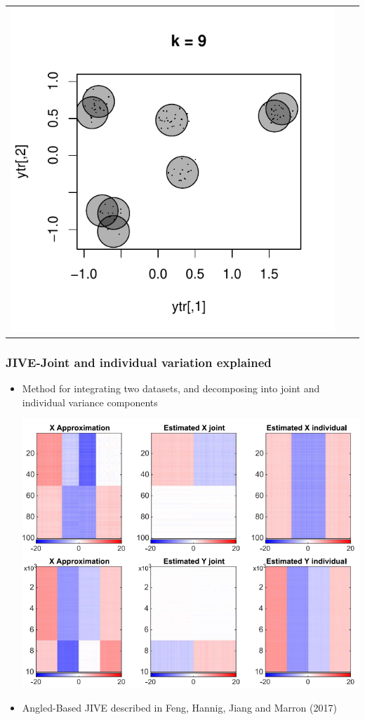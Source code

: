 \documentclass{beamer}
\begin{document}
\begin{frame}
\begin{center}
\begin{tabular}{ccc}
\includegraphics[scale = \scalesize, clip = true, trim = 0.3in 0.4in 0.3in 0.2in]{../conformal_kmeans/k9.pdf} \\
\end{tabular}
\end{center}
\end{frame}


\begin{frame}
\frametitle{JIVE-Joint and individual variation explained}
\begin{itemize}
\item Method for integrating two datasets, and decomposing into joint and individual variance components
\begin{center}
\includegraphics[scale = 0.3]{jsm_figs/jive_decomposition.png}
\end{center}
\item Angled-Based JIVE described in Feng, Hannig, Jiang and Marron (2017)
\end{itemize}
\end{frame}
\end{document}
